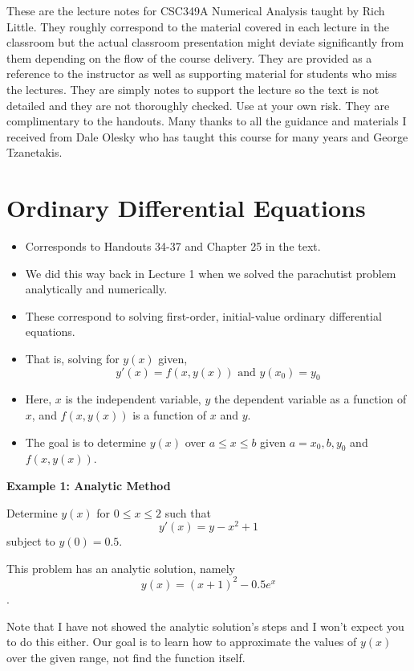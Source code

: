 \documentclass [titlepage,12pt,letter] {article}
\begin{document}
 


These are the lecture notes for CSC349A Numerical Analysis taught by
Rich Little. They roughly correspond to
the material covered in each lecture in the classroom but the actual
classroom presentation might deviate significantly from them depending
on the flow of the course delivery. They are provided as a reference to
the instructor as well as supporting material for students who miss
the lectures. They are simply notes to support the lecture so the text
is not detailed and they are not thoroughly checked. Use at your own
risk. They are complimentary to the handouts. Many thanks to all the
guidance and materials I received from Dale Olesky who has taught this
course for many years and George Tzanetakis. 

\section{Ordinary Differential Equations}

\begin{itemize}
\item{Corresponds to Handouts 34-37 and Chapter 25 in the text.}
\item{We did this way back in Lecture 1 when we solved the parachutist problem analytically and numerically.}
\item{These correspond to solving first-order, initial-value ordinary differential equations.}
\item{That is, solving for $y(x)$ given,
\[
y'(x)=f(x,y(x)) \text{ and } y(x_0) = y_0
\]}
\item{Here, $x$ is the independent variable, $y$ the dependent variable as a function of $x$, and $f(x,y(x))$ is a function of $x$ and $y$.}
\item{The goal is to determine $y(x)$ over $a \leq x \leq b$ given $a=x_0,b,y_0$ and $f(x,y(x))$.}
\end{itemize}

{\bf Example 1: Analytic Method}

Determine $y(x)$ for $0 \leq x \leq 2$ such that
\[
y'(x) = y - x^2 + 1
\]
subject to $y(0) = 0.5$.

\vspace{\baselineskip}
This problem has an analytic solution, namely \[y(x) = (x+1)^2 - 0.5e^x\]. 

Note that I have not showed the analytic solution's steps and I won't expect you to do this either. Our goal is to learn how to approximate the values of $y(x)$ over the given range, not find the function itself.
\end{document}
